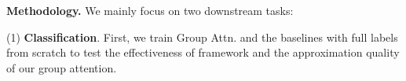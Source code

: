 






\noindent\textbf{Methodology.}
We mainly focus on two downstream tasks:

(1) \textbf{Classification}. 
First, we train Group Attn. and the baselines with full labels from scratch to test the effectiveness of \system framework and the approximation quality of our group attention. 

